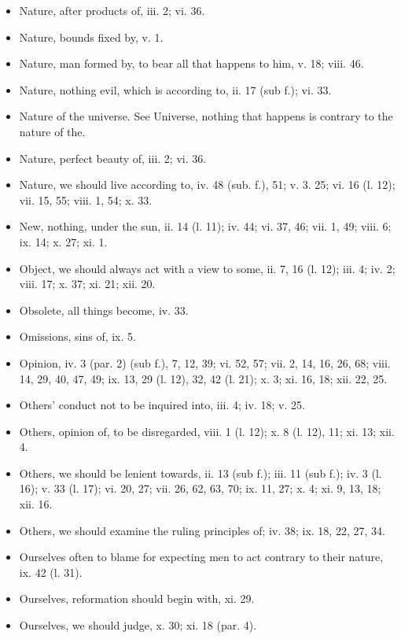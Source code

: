 \begin{itemize}[leftmargin=*]
\setlength\itemsep{0em}
\item
  Nature, after products of, iii. 2; vi. 36.
\item
  Nature, bounds fixed by, v. 1.
\item
  Nature, man formed by, to bear all that happens to him, v. 18; viii.
  46.
\item
  Nature, nothing evil, which is according to, ii. 17 (sub f.); vi. 33.
\item
  Nature of the universe. See Universe, nothing that happens is contrary
  to the nature of the.
\item
  Nature, perfect beauty of, iii. 2; vi. 36.
\item
  Nature, we should live according to, iv. 48 (sub. f.), 51; v. 3. 25;
  vi. 16 (l. 12); vii. 15, 55; viii. 1, 54; x. 33.
\item
  New, nothing, under the sun, ii. 14 (l. 11); iv. 44; vi. 37, 46; vii.
  1, 49; viii. 6; ix. 14; x. 27; xi. 1.
\end{itemize}

\begin{itemize}[leftmargin=*]
\setlength\itemsep{0em}
\item
  Object, we should always act with a view to some, ii. 7, 16 (l. 12);
  iii. 4; iv. 2; viii. 17; x. 37; xi. 21; xii. 20.
\item
  Obsolete, all things become, iv. 33.
\item
  Omissions, sins of, ix. 5.
\item
  Opinion, iv. 3 (par. 2) (sub f.), 7, 12, 39; vi. 52, 57; vii. 2, 14,
  16, 26, 68; viii. 14, 29, 40, 47, 49; ix. 13, 29 (l. 12), 32, 42 (l.
  21); x. 3; xi. 16, 18; xii. 22, 25.
\item
  Others' conduct not to be inquired into, iii. 4; iv. 18; v. 25.
\item
  Others, opinion of, to be disregarded, viii. 1 (l. 12); x. 8 (l. 12),
  11; xi. 13; xii. 4.
\item
  Others, we should be lenient towards, ii. 13 (sub f.); iii. 11 (sub
  f.); iv. 3 (l. 16); v. 33 (l. 17); vi. 20, 27; vii. 26, 62, 63, 70;
  ix. 11, 27; x. 4; xi. 9, 13, 18; xii. 16.
\item
  Others, we should examine the ruling principles of; iv. 38; ix. 18,
  22, 27, 34.
\item
  Ourselves often to blame for expecting men to act contrary to their
  nature, ix. 42 (l. 31).
\item
  Ourselves, reformation should begin with, xi. 29.
\item
  Ourselves, we should judge, x. 30; xi. 18 (par. 4).
\end{itemize}

